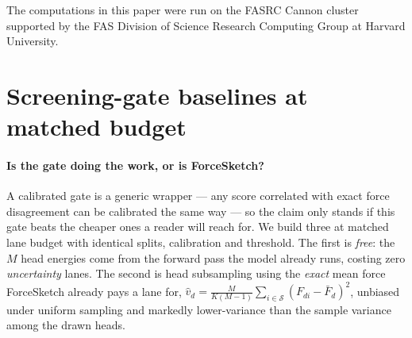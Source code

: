 \documentclass{article}
\begin{document}
\begin{ack}
The computations in this paper were run on the FASRC Cannon cluster supported by
the FAS Division of Science Research Computing Group at Harvard University.
\end{ack}






\appendix

\section{Screening-gate baselines at matched budget}
\label{app:gates}
\paragraph{Is the gate doing the work, or is ForceSketch?}
A calibrated gate is a generic wrapper --- any score correlated with exact force disagreement can be
calibrated the same way --- so the claim only stands if this gate beats the cheaper ones a reader
will reach for. We build three at matched lane budget with identical splits, calibration and
threshold. The first is \emph{free}: the $M$ head energies come from the forward pass the model
already runs, costing zero \emph{uncertainty} lanes. The second is head subsampling using the
\emph{exact} mean force ForceSketch already pays a lane for,
$\hat v_d=\frac{M}{K(M-1)}\sum_{i\in\mathcal S}(F_{di}-\bar F_d)^2$, unbiased under uniform sampling
and markedly lower-variance than the sample variance among the drawn heads.
\end{document}
